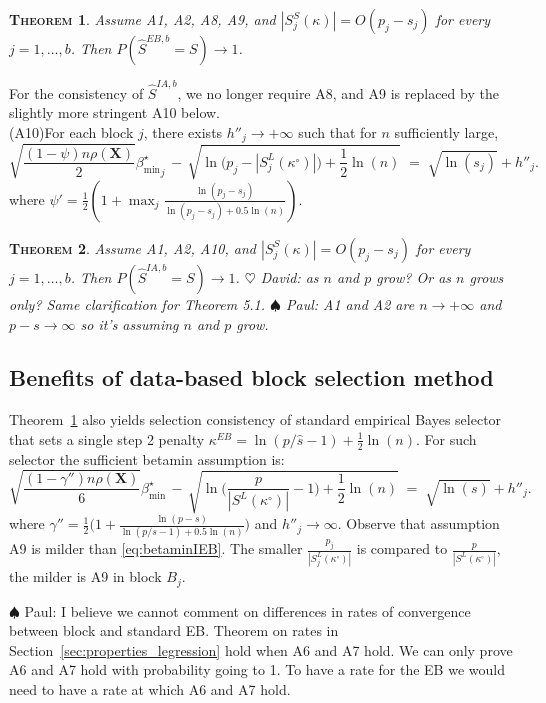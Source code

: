 \documentclass[aos]{imsart}
\theoremstyle{plain}
\newtheorem{thm}{\textsc{Theorem}}[section]
\newcommand{\david}[1]{{\small{\color{blue} \sf $\heartsuit$ David: #1}}}
\newcommand{\paul}[1]{{\small{\color{green} \sf $\spadesuit$ Paul: #1}}}
\newcommand{\bs}{\boldsymbol}
\begin{document}
\begin{thm}\label{theo:empbayesselconsist}
    Assume A1, A2, A8, A9, and $|S^{S}_j(\kappa)|=O(p_j-s_j)$ for every $j=1,\ldots,b$. Then
$P(\hat{S}^{EB,b} = S) \to 1$.
\end{thm}
For the consistency of $\hat{S}^{IA,b}$, we no longer require A8, and A9 is replaced by the slightly more stringent A10 below. \\[5pt]
(A10)\quad For each block $j$, there exists $h''_j\to +\infty$ such that for $n$ sufficiently large,
\begin{equation*}
        \sqrt{\frac{ (1-\psi)n\rho(\bs X)}{2}}{\beta_{\min}^{\star}}_j \,- \,\sqrt{\ln\big(p_j-|S^{L}_j(\kappa^{\circ})|\big)+\frac12\ln(n)} \;=\; \sqrt{\ln(s_j)} + h''_j .
    \end{equation*}
where  $\psi'=\frac12(1+\max_j \frac{\ln(p_j-s_j)}{\ln(p_j-s_j)+0.5\ln(n)})$.

\begin{thm}\label{theo:informedl0consist}
    Assume A1, A2, A10, and $|S^{S}_j(\kappa)|=O(p_j-s_j)$ for every $j=1,\ldots,b$. Then 
$P(\hat{S}^{IA,b} = S) \to 1$. \david{as $n$ and $p$ grow? Or as $n$ grows only? Same clarification for Theorem 5.1.} \paul{A1 and A2 are $n\to+\infty$ and $p-s\to\infty$ so it's assuming $n$ and $p$ grow.}
\end{thm}

\subsection{Benefits of data-based block selection method}

Theorem~\ref{theo:empbayesselconsist} also yields selection consistency of standard empirical Bayes selector that sets a single step 2 penalty $\kappa^{EB}=\ln(p/\widehat{s} -1)+ \tfrac{1}{2}\ln(n)$. For such selector the sufficient betamin assumption is:
\begin{equation}\label{eq:betaminIEB}
        \sqrt{\frac{ (1-\gamma'')n\rho(\bs X)}{6}}{\beta_{\min}^{\star}} \,- \,\sqrt{\ln\bigg(\frac{p}{|S^{L}(\kappa^{\circ})|}-1\bigg)+\frac12\ln(n)} \;=\; \sqrt{\ln(s)} + h''_j .
    \end{equation}
where $\gamma''=\frac12\big(1+ \frac{\ln(p-s)}{\ln(p/s-1)+0.5\ln(n)}\big)$ and $h''_j \to \infty$. Observe that assumption A9 is milder than \eqref{eq:betaminIEB}. The smaller $\frac{p_j}{|S^{L}_j(\kappa^{\circ})|}$ is compared to $\frac{p}{|S^{L}(\kappa^{\circ})|}$, the milder is A9 in block $B_j$. 

\paul{I believe we cannot comment on differences in rates of convergence between block and standard EB. Theorem on rates in Section~\ref{sec:properties_legression} hold when A6 and A7 hold. We can only prove A6 and A7 hold with probability going to 1. To have a rate for the EB we would need to have a rate at which A6 and A7 hold.}
\end{document}
